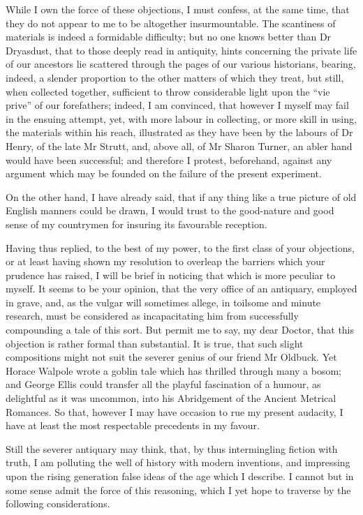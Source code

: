 While I own the force of these objections, I must confess, at the same
time, that they do not appear to me to be altogether insurmountable. The
scantiness of materials is indeed a formidable difficulty; but no one
knows better than Dr Dryasdust, that to those deeply read in antiquity,
hints concerning the private life of our ancestors lie scattered through
the pages of our various historians, bearing, indeed, a slender
proportion to the other matters of which they treat, but still, when
collected together, sufficient to throw considerable light upon the
``vie prive'' of our forefathers; indeed, I am convinced, that however I
myself may fail in the ensuing attempt, yet, with more labour in
collecting, or more skill in using, the materials within his reach,
illustrated as they have been by the labours of Dr Henry, of the late Mr
Strutt, and, above all, of Mr Sharon Turner, an abler hand would have
been successful; and therefore I protest, beforehand, against any
argument which may be founded on the failure of the present experiment.

On the other hand, I have already said, that if any thing like a true
picture of old English manners could be drawn, I would trust to the
good-nature and good sense of my countrymen for insuring its favourable
reception.

Having thus replied, to the best of my power, to the first class of your
objections, or at least having shown my resolution to overleap the
barriers which your prudence has raised, I will be brief in noticing
that which is more peculiar to myself. It seems to be your opinion, that
the very office of an antiquary, employed in grave, and, as the vulgar
will sometimes allege, in toilsome and minute research, must be
considered as incapacitating him from successfully compounding a tale of
this sort. But permit me to say, my dear Doctor, that this objection is
rather formal than substantial. It is true, that such slight
compositions might not suit the severer genius of our friend Mr Oldbuck.
Yet Horace Walpole wrote a goblin tale which has thrilled through many a
bosom; and George Ellis could transfer all the playful fascination of a
humour, as delightful as it was uncommon, into his Abridgement of the
Ancient Metrical Romances. So that, however I may have occasion to rue
my present audacity, I have at least the most respectable precedents in
my favour.

Still the severer antiquary may think, that, by thus intermingling
fiction with truth, I am polluting the well of history with modern
inventions, and impressing upon the rising generation false ideas of the
age which I describe. I cannot but in some sense admit the force of this
reasoning, which I yet hope to traverse by the following considerations.

